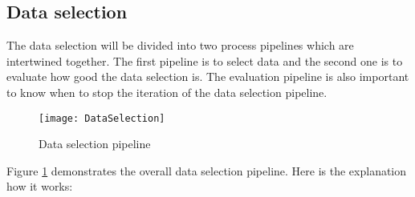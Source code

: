 \subsection{Data selection}
\label{ch3:dataselection}
The data selection will be divided into two process pipelines which are intertwined together. The first pipeline is to select data and the second one is to evaluate how good the data selection is. The evaluation pipeline is  also important to know when to stop the iteration of the data selection pipeline.

\begin{figure}[H]
\caption{Data selection pipeline}
\label{selectionPipeline}
\texttt{[image: DataSelection]} 
\centering
\end{figure}   

Figure \ref{selectionPipeline} demonstrates the overall data selection pipeline. Here is the explanation how it works:

